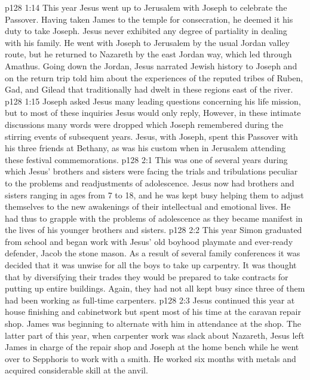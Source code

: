 \vs p128 1:14 \pc This year Jesus went up to Jerusalem with Joseph to celebrate the Passover. Having taken James to the temple for consecration, he deemed it his duty to take Joseph. Jesus never exhibited any degree of partiality in dealing with his family. He went with Joseph to Jerusalem by the usual Jordan valley route, but he returned to Nazareth by the east Jordan way, which led through Amathus. Going down the Jordan, Jesus narrated Jewish history to Joseph and on the return trip told him about the experiences of the reputed tribes of Ruben, Gad, and Gilead that traditionally had dwelt in these regions east of the river.
\vs p128 1:15 Joseph asked Jesus many leading questions concerning his life mission, but to most of these inquiries Jesus would only reply,  However, in these intimate discussions many words were dropped which Joseph remembered during the stirring events of subsequent years. Jesus, with Joseph, spent this Passover with his three friends at Bethany, as was his custom when in Jerusalem attending these festival commemorations.
\vs p128 2:1 This was one of several years during which Jesus’ brothers and sisters were facing the trials and tribulations peculiar to the problems and readjustments of adolescence. Jesus now had brothers and sisters ranging in ages from 7 to 18, and he was kept busy helping them to adjust themselves to the new awakenings of their intellectual and emotional lives. He had thus to grapple with the problems of adolescence as they became manifest in the lives of his younger brothers and sisters.
\vs p128 2:2 This year Simon graduated from school and began work with Jesus’ old boyhood playmate and ever\hyp{}ready defender, Jacob the stone mason. As a result of several family conferences it was decided that it was unwise for all the boys to take up carpentry. It was thought that by diversifying their trades they would be prepared to take contracts for putting up entire buildings. Again, they had not all kept busy since three of them had been working as full\hyp{}time carpenters.
\vs p128 2:3 Jesus continued this year at house finishing and cabinetwork but spent most of his time at the caravan repair shop. James was beginning to alternate with him in attendance at the shop. The latter part of this year, when carpenter work was slack about Nazareth, Jesus left James in charge of the repair shop and Joseph at the home bench while he went over to Sepphoris to work with a smith. He worked six months with metals and acquired considerable skill at the anvil.
